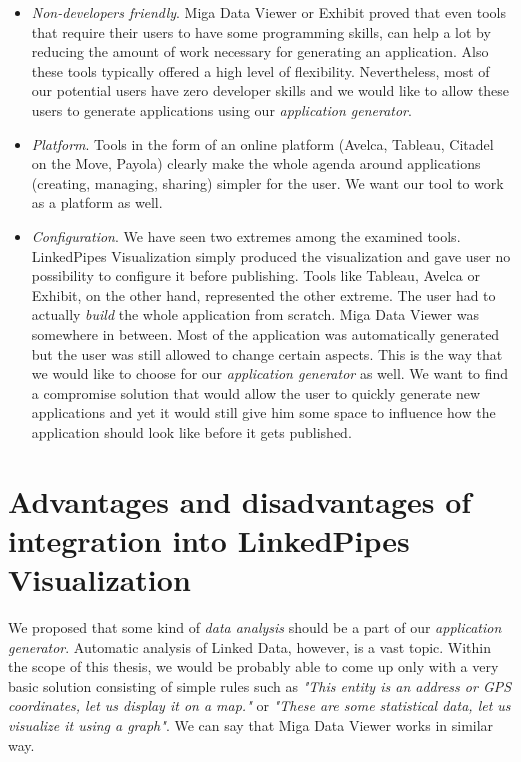 \begin{itemize}
\item \emph{Non-developers friendly}. Miga Data Viewer or Exhibit proved that even tools that require their users to have some programming skills, can help a lot by reducing the amount of work necessary for generating an application. Also these tools typically offered a high level of flexibility. Nevertheless, most of our potential users have zero developer skills and we would like to allow these users to generate applications using our \emph{application generator}.
\item \emph{Platform}. Tools in the form of an online platform (Avelca, Tableau, Citadel on the Move, Payola) clearly make the whole agenda around applications (creating, managing, sharing) simpler for the user. We want our tool to work as a platform as well.
\item \emph{Configuration}. We have seen two extremes among the examined tools. LinkedPipes Visualization simply produced the visualization and gave user no possibility to configure it before publishing. Tools like Tableau, Avelca or Exhibit, on the other hand, represented the other extreme. The user had to actually \emph{build} the whole application from scratch. Miga Data Viewer was somewhere in between. Most of the application was automatically generated but the user was still allowed to change certain aspects. This is the way that we would like to choose for our \emph{application generator} as well. We want to find a compromise solution that would allow the user to quickly generate new applications and yet it would still give him some space to influence how the application should look like before it gets published.
\end{itemize}

\section{Advantages and disadvantages of integration into LinkedPipes Visualization}
\label{sec:system_proposal:integration}

We proposed that some kind of \emph{data analysis} should be a part of our \emph{application generator}. Automatic analysis of Linked Data, however, is a vast topic. Within the scope of this thesis, we would be probably able to come up only with a very basic solution consisting of simple rules such as  \textit{"This entity is an address or GPS coordinates, let us display it on a map."} or \textit{"These are some statistical data, let us visualize it using a graph"}. We can say that Miga Data Viewer works in similar way.


